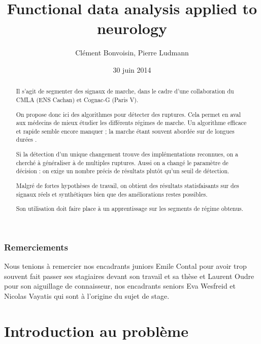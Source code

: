 \documentclass[french,11pt,notitlepage]{report}
\begin{document}
	\title{Functional data analysis applied to neurology}
	\author{Clément Bonvoisin, Pierre Ludmann}
	\date{30 juin 2014}
	\maketitle

	\begin{abstract}
  
Il s'agit de segmenter des signaux de marche,
dans le cadre d'une collaboration du CMLA (ENS Cachan) et Cognac-G (Paris V).

On propose donc ici des algorithmes pour détecter des ruptures.
Cela permet en aval aux médecins de mieux étudier les différents régimes de marche.
Un algorithme efficace et rapide semble encore manquer ;
la marche étant souvent abordée sur de longues durées \cite{Was}.

Si la détection d'un unique changement trouve des implémentations reconnues,
on a cherché à généraliser à de multiples ruptures.
Aussi on a changé le paramètre de décision :
on exige un nombre précis de résultats plutôt qu'un seuil de détection.

Malgré de fortes hypothèses de travail,
on obtient des résultats statisfaisants sur des signaux réels et synthétiques
bien que des améliorations restes possibles.

Son utilisation doit faire place à un apprentissage sur les segments de régime obtenus.
	
	\end{abstract}

\phantom{kcahkcah}

\subsection*{Remerciements}

Nous tenions à remercier nos encadrants juniors
Emile Contal pour avoir trop souvent fait passer ses stagiaires devant son travail et sa thèse et
Laurent Oudre pour son aiguillage de connaisseur,
nos encadrants seniors Eva Wesfreid et Nicolas Vayatis qui sont à l'origine du sujet de stage.




	\tableofcontents



	\chapter{Introduction au problème}
	
\end{document}
